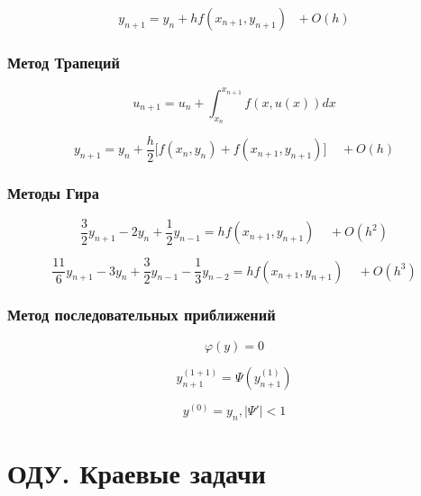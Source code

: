 \begin{equation*}
    y_{n+1} = y_n + hf(x_{n+1}, y_{n+1})\ \ \ + O(h)
\end{equation*}

\subsubsection{Метод Трапеций}

\begin{equation*}
    u_{n+1} = u_n + \int_{x_n}^{x_{n+1}} f(x, u(x)) dx
\end{equation*}

\begin{equation*}
    y_{n+1} = y_n + \frac{h}{2} \bigg[ f(x_n, y_n) +
    f(x_{n+1}, y_{n+1}) \bigg]\ \ \ \ \ + O(h)
\end{equation*}

\subsubsection{Методы Гира}

\begin{equation*}
    \frac{3}{2} y_{n+1} - 2y_n + \frac{1}{2} y_{n-1} =
    hf(x_{n+1}, y_{n+1}) \ \ \ \ \ + O(h^2)
\end{equation*}

\begin{equation*}
    \frac{11}{6} y_{n+1} - 3y_n + \frac{3}{2} y_{n-1} - \frac{1}{3}
    y_{n-2} = hf(x_{n+1}, y_{n+1}) \ \ \ \ \ +O(h^3)
\end{equation*}

\subsubsection{Метод последовательных приближений}

\begin{equation*}
    \varphi(y) = 0
\end{equation*}

\begin{equation*}
    y_{n+1}^{(1+1)} = \Psi (y_{n+1}^{(1)})
\end{equation*}

\begin{equation*}
    y^{(0)} = y_n, |\Psi'| < 1
\end{equation*}

\section{ОДУ. Краевые задачи}

